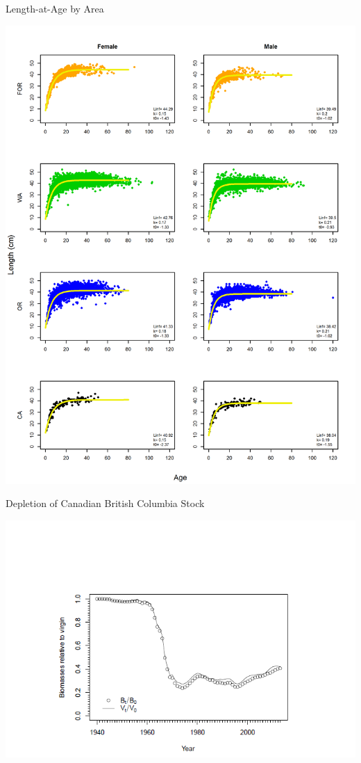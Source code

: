 \documentclass[pdf]{beamer}\usepackage[]{graphicx}\usepackage[]{color}
\begin{document}
\begin{frame}{Length-at-Age by Area}
  \begin{center}
  \includegraphics[scale = 0.35]{figures/LengthAge_StateEach_wCanada.png}
  \end{center}
\end{frame}


\begin{frame}{Depletion of Canadian British Columbia Stock}
  \begin{center}
    \includegraphics[scale = 0.60, trim={1cm 0cm 1cm 1.7cm}, clip]{figures/Canadian_Depletion.png}
  \end{center}
\end{frame}
\end{document}
